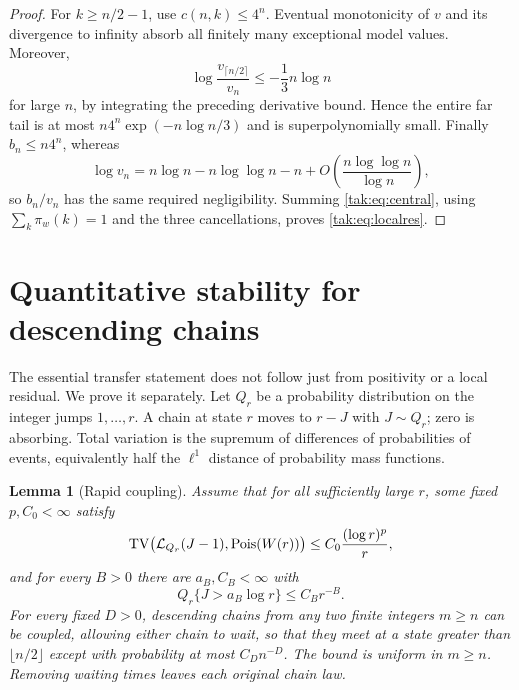 \documentclass[11pt,letterpaper]{article}
\newtheorem{lemma}[theorem]{Lemma}
\theoremstyle{remark}\newtheorem{remark}[theorem]{Remark}
\newcommand{\TV}{\operatorname{TV}}\newcommand{\Pois}{\operatorname{Pois}}
\begin{document}
\begin{proof}
For $k\geq n/2-1$, use $c(n,k)\leq4^n$. Eventual monotonicity of $v$ and its divergence to infinity absorb all finitely many exceptional model values. Moreover,
\[
 \log\frac{v_{\lceil n/2\rceil}}{v_n}\leq-\frac13 n\log n
\]
for large $n$, by integrating the preceding derivative bound. Hence the entire far tail is at most $n4^n\exp(-n\log n/3)$ and is superpolynomially small.
Finally $b_n\leq n4^n$, whereas
\[
 \log v_n=n\log n-n\log\log n-n
                +O\!\left(\frac{n\log\log n}{\log n}\right),
\]
so $b_n/v_n$ has the same required negligibility. Summing \eqref{tak:eq:central}, using $\sum_k\pi_w(k)=1$ and the three cancellations, proves \eqref{tak:eq:localres}.
\end{proof}

\section{Quantitative stability for descending chains}\label{tak:sec:coupling}
The essential transfer statement does not follow just from positivity or a local residual. We prove it separately. Let $Q_r$ be a probability distribution on the integer jumps $1,\ldots,r$. A chain at state $r$ moves to $r-J$ with $J\sim Q_r$; zero is absorbing. Total variation is the supremum of differences of probabilities of events, equivalently half the $\ell^1$ distance of probability mass functions.

\begin{lemma}[Rapid coupling]\label{tak:lem:coupling}
Assume that for all sufficiently large $r$, some fixed $p,C_0<\infty$ satisfy
\begin{equation}
 \TV\bigl(\cL_{Q_r}(J-1),\Pois(W(r))\bigr)
       \leq C_0\frac{(\log r)^p}{r},\label{tak:eq:tvassume}
\end{equation}
and for every $B>0$ there are $a_B,C_B<\infty$ with
\begin{equation}
 Q_r\{J>a_B\log r\}\leq C_Br^{-B}.\label{tak:eq:tailassume}
\end{equation}
For every fixed $D>0$, descending chains from any two finite integers $m\geq n$ can be coupled, allowing either chain to wait, so that they meet at a state greater than $\lfloor n/2\rfloor$ except with probability at most $C_Dn^{-D}$. The bound is uniform in $m\geq n$. Removing waiting times leaves each original chain law.
\end{lemma}
\end{document}
